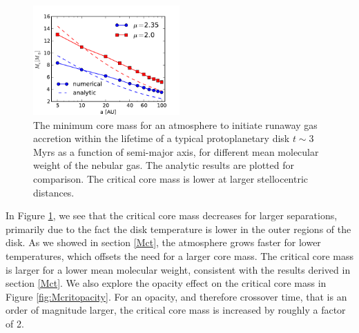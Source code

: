 \documentclass[apj]{emulateapj}
\begin{document}
\begin{figure}[h]
\centering
\includegraphics[width=0.5\textwidth]{../../figs/ModelAtmospheres/RadSelfGravPoly/PaperFigs/Mcrit_vs_a_3Myrs_new.pdf}
\caption{The minimum core mass for an atmosphere to initiate runaway gas accretion within the lifetime of a typical protoplanetary disk $t \sim 3$ Myrs as a function of semi-major axis, for different mean molecular weight of the nebular gas. The analytic results are plotted for comparison. The critical core mass is lower at larger stellocentric distances.}
\label{fig:Mcvsa}
\end{figure}

 In Figure \ref{fig:Mcvsa}, we see that the critical core mass decreases for larger separations, primarily due to the fact the disk temperature is lower in the outer regions of the disk. As we showed in section \ref{Mct}, the atmosphere grows faster for lower temperatures, which offsets the need for a larger core mass. The critical core mass is larger for a lower mean molecular weight, consistent with the results derived in section \ref{Mct}. We also explore the opacity effect on the critical core mass in Figure \ref{fig:Mcritopacity}. For an opacity, and therefore crossover time, that is an order of magnitude larger, the critical core mass is increased by roughly a factor of 2. 
\end{document}
